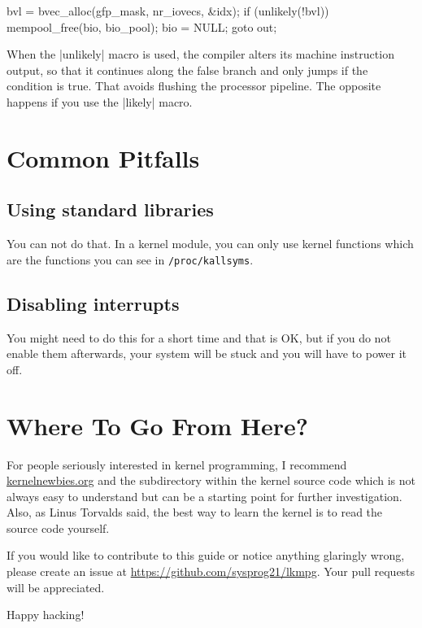 \documentclass[10pt, oneside]{book}
\begin{document}
\begin{code}
bvl = bvec_alloc(gfp_mask, nr_iovecs, &idx);
if (unlikely(!bvl)) {
    mempool_free(bio, bio_pool);
    bio = NULL;
    goto out;
}
\end{code}

When the \cpp|unlikely| macro is used, the compiler alters its machine instruction output, so that it continues along the false branch and only jumps if the condition is true.
That avoids flushing the processor pipeline.
The opposite happens if you use the \cpp|likely| macro.

\section{Common Pitfalls}
\label{sec:opitfall}

\subsection{Using standard libraries}
\label{sec:using_stdlib}
You can not do that.
In a kernel module, you can only use kernel functions which are the functions you can see in \verb|/proc/kallsyms|.

\subsection{Disabling interrupts}
\label{sec:disabling_interrupts}
You might need to do this for a short time and that is OK, but if you do not enable them afterwards, your system will be stuck and you will have to power it off.

\section{Where To Go From Here?}
\label{sec:where_to_go}
For people seriously interested in kernel programming, I recommend \href{https://kernelnewbies.org}{kernelnewbies.org} and the  subdirectory within the kernel source code which is not always easy to understand but can be a starting point for further investigation.
Also, as Linus Torvalds said, the best way to learn the kernel is to read the source code yourself.

If you would like to contribute to this guide or notice anything glaringly wrong, please create an issue at \url{https://github.com/sysprog21/lkmpg}.
Your pull requests will be appreciated.

Happy hacking!
\end{document}
